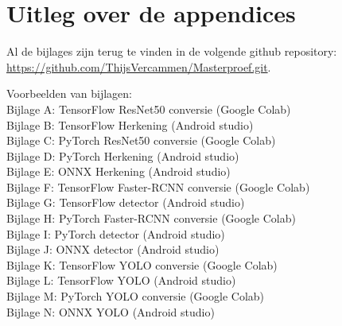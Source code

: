 \chapter{Uitleg over de appendices}
Al de bijlages zijn terug te vinden in de volgende github repository: \url{https://github.com/ThijsVercammen/Masterproef.git}.

Voorbeelden van bijlagen:\\
Bijlage A: \qquad	TensorFlow ResNet50 conversie (Google Colab)\\
Bijlage B: \qquad	TensorFlow Herkening (Android studio) \\
Bijlage C: \qquad	PyTorch ResNet50 conversie (Google Colab) \\
Bijlage D: \qquad	PyTorch Herkening (Android studio) \\
Bijlage E: \qquad	ONNX Herkening (Android studio) \\
Bijlage F: \qquad	TensorFlow Faster-RCNN conversie (Google Colab)\\
Bijlage G: \qquad	TensorFlow detector (Android studio) \\
Bijlage H: \qquad	PyTorch Faster-RCNN conversie (Google Colab) \\
Bijlage I: \qquad	PyTorch detector (Android studio) \\
Bijlage J: \qquad	ONNX detector (Android studio) \\
Bijlage K: \qquad	TensorFlow YOLO conversie (Google Colab)\\
Bijlage L: \qquad	TensorFlow YOLO (Android studio) \\
Bijlage M: \qquad	PyTorch YOLO conversie (Google Colab) \\
Bijlage N: \qquad	ONNX YOLO (Android studio) \\
\\



